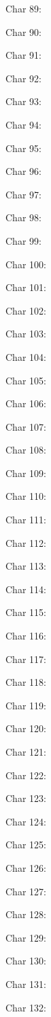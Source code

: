 Char 89: 

Char 90: 

Char 91: 

Char 92: 

Char 93: 

Char 94: 

Char 95: 

Char 96: 

Char 97: 

Char 98: 

Char 99: 

Char 100: 

Char 101: 

Char 102: 

Char 103: 

Char 104: 

Char 105: 

Char 106: 

Char 107: 

Char 108: 

Char 109: 

Char 110: 

Char 111: 

Char 112: 

Char 113: 

Char 114: 

Char 115: 

Char 116: 

Char 117: 

Char 118: 

Char 119: 

Char 120: 

Char 121: 

Char 122: 

Char 123: 

Char 124: 

Char 125: 

Char 126: 

Char 127: 

Char 128: 

Char 129: 

Char 130: 

Char 131: 

Char 132: 

